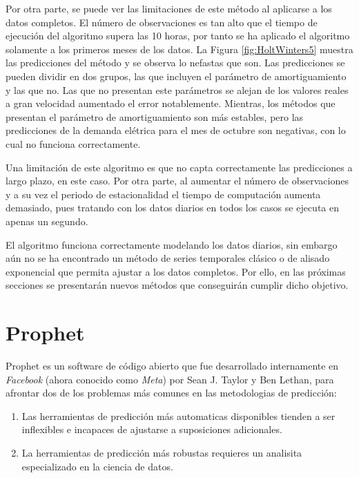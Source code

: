 \documentclass[12pt,twoside]{article}
\begin{document}
Por otra parte, se puede ver las limitaciones de este método al aplicarse a los datos completos. El número de observaciones es tan alto que el tiempo de ejecución del algoritmo supera las 10 horas, por tanto se ha aplicado el algoritmo solamente a los primeros meses de los datos. La Figura \ref{fig:HoltWinters5} muestra las predicciones del método y se observa lo nefastas que son. Las predicciones se pueden dividir en dos grupos, las que incluyen el parámetro de amortiguamiento y las que no. Las que no presentan este parámetros se alejan de los valores reales a gran velocidad aumentado el error notablemente. Mientras, los métodos que presentan el parámetro de amortiguamiento son más estables, pero las predicciones de la demanda elétrica para el mes de octubre son negativas, con lo cual no funciona correctamente.

Una limitación de este algoritmo es que no capta correctamente las predicciones a largo plazo, en este caso. Por otra parte, al aumentar el número de observaciones y a su vez el periodo de estacionalidad el tiempo de computación aumenta demasiado, pues tratando con los datos diarios en todos los casos se ejecuta en apenas un segundo.

El algoritmo funciona correctamente modelando los datos diarios, sin embargo aún no se ha encontrado un método de series temporales clásico o de alisado exponencial que permita ajustar a los datos completos. Por ello, en las próximas secciones se presentarán nuevos métodos que conseguirán cumplir dicho objetivo.









\newpage
\section{Prophet}
Prophet es un software de código abierto que fue desarrollado internamente en \emph{Facebook} (ahora conocido como \emph{Meta}) por Sean J. Taylor y Ben Lethan, para afrontar dos de los problemas más comunes en las metodologias de predicción:
\begin{enumerate}
    \item Las herramientas de predicción más automaticas disponibles tienden a ser inflexibles e incapaces de ajustarse a suposiciones adicionales.
    \item La herramientas de predicción más robustas requieres un analisita especializado en la ciencia de datos.
\end{enumerate}
\end{document}
